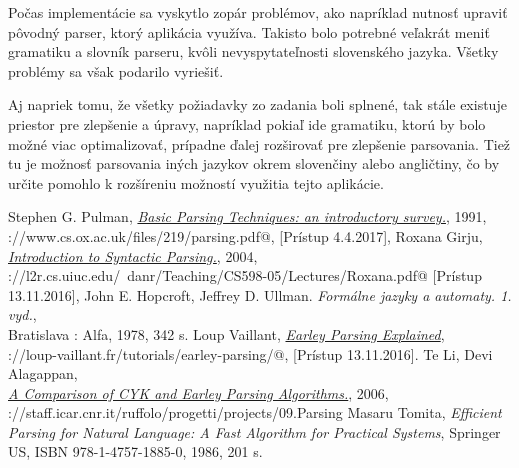 \documentclass[12pt,a4paper]{report}
\theoremstyle{definition}
\theoremstyle{remark}
\begin{document}
Počas implementácie sa vyskytlo zopár problémov, ako napríklad nutnosť upraviť pôvodný parser, ktorý aplikácia využíva. Takisto bolo potrebné veľakrát meniť gramatiku a slovník parseru, kvôli nevyspytateľnosti slovenského jazyka. Všetky problémy sa však podarilo vyriešiť.

Aj napriek tomu, že všetky požiadavky zo zadania boli splnené, tak stále existuje priestor pre zlepšenie a úpravy, napríklad pokiaľ ide gramatiku, ktorú by bolo možné viac optimalizovať, prípadne ďalej rozširovať pre zlepšenie parsovania. Tiež tu je možnosť parsovania iných jazykov okrem slovenčiny alebo angličtiny, čo by určite pomohlo k rozšíreniu možností využitia tejto aplikácie. 

\renewcommand\bibname{Literatúra}
\begin{thebibliography}{99}
Stephen G. Pulman, \emph{\href{https://www.cs.ox.ac.uk/files/219/parsing.pdf}{Basic Parsing Techniques: an introductory survey.}}, 1991, \\ \verb@https://www.cs.ox.ac.uk/files/219/parsing.pdf@, [Prístup 4.4.2017],
Roxana Girju, \emph{\href{http://l2r.cs.uiuc.edu/~danr/Teaching/CS598-05/Lectures/Roxana.pdf}{Introduction to Syntactic Parsing.}}, 2004, \\ \verb@http://l2r.cs.uiuc.edu/~danr/Teaching/CS598-05/Lectures/Roxana.pdf@ [Prístup 13.11.2016],
John E. Hopcroft, Jeffrey D. Ullman. \emph{Formálne jazyky a automaty. 1. vyd.}, \\ Bratislava : Alfa, 1978, 342 s.
Loup Vaillant, \emph{\href{http://loup-vaillant.fr/tutorials/earley-parsing/}{Earley Parsing Explained}}, \\ \verb@http://loup-vaillant.fr/tutorials/earley-parsing/@, [Prístup 13.11.2016].
Te Li, Devi Alagappan, \\
\emph{\href{http://staff.icar.cnr.it/ruffolo/progetti/projects/09.Parsing\%20CYK/A\%20Comparison\%20of\%20CYK\%20and\%20Earley\%20Parsing\%20Algorithms-cykeReport.pdf}{A Comparison of CYK and Earley Parsing Algorithms.}}, 2006, \\ \verb@http://staff.icar.cnr.it/ruffolo/progetti/projects/09.Parsing\@
\verb@%20CYK/A\%20Comparison\%20of\%20CYK\%20and\%20Earley\%20Parsing\@
\verb@%20Algorithms-cykeReport.pdf@ [Prístup 18.11.2016],
Masaru Tomita, \emph{Efficient Parsing for Natural Language: A Fast Algorithm for Practical Systems}, Springer US, ISBN 978-1-4757-1885-0, 1986, 201 s.


\end{thebibliography}
\end{document}
